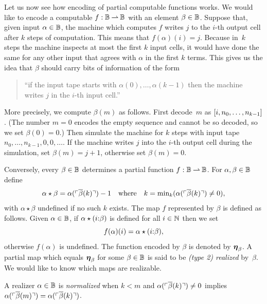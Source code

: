 Let us now see how encoding of partial computable functions works. We
would like to encode a computable $f : \mathbb{B} \mathbin{\rightharpoonup} \mathbb{B}$ with an
element $\beta \in \mathbb{B}$. Suppose that, given input $\alpha \in
\mathbb{B}$, the machine which computes $f$ writes $j$ to the $i$-th
output cell after $k$ steps of computation. This means that
$f(\alpha)(i) = j$. Because in~$k$ steps the machine inspects at most
the first $k$ input cells, it would have done the same for any other
input that agrees with $\alpha$ in the first $k$ terms. This gives us
the idea that $\beta$ should carry bits of information of the form
%
\begin{quote}
  ``if the input tape starts with $\alpha(0), \ldots,
  \alpha(k-1)$ then the machine writes $j$ in the $i$-th input
  cell.''
\end{quote}
%
More precisely, we compute $\beta(m)$ as follows. First decode~$m$ as
$[i, n_0, \ldots, n_{k-1}]$. (The number $m = 0$ encodes the empty
sequence and cannot be so decoded, so we set $\beta(0) = 0$.) Then
simulate the machine for $k$ steps with input tape $n_0, \ldots,
n_{k-1}, 0, 0, \ldots$. If the machine writes $j$ into the $i$-th
output cell during the simulation, set $\beta(m) = j + 1$, otherwise
set $\beta(m) = 0$.

Conversely, every $\beta \in \mathbb{B}$ determines a partial function $f :
\mathbb{B} \mathbin{\rightharpoonup} \mathbb{B}$. For $\alpha, \beta \in \mathbb{B}$ define
%
\begin{equation*}
  \alpha \star \beta = \alpha(\ulcorner \overline{\beta}(k) \urcorner) - 1
  \quad\text{where}\quad
  k = \min\nolimits_k (\alpha(\ulcorner \overline{\beta}(k) \urcorner) \neq 0),
\end{equation*}
%
with $\alpha \star \beta$ undefined if no such $k$ exists. The map $f$
represented by $\beta$ is defined as follows. Given $\alpha \in
\mathbb{B}$, if $\alpha \star
(i {:} \beta)$ is defined for all $i \in \mathbb{N}$ then we set
%
\begin{equation}
  \label{eq:type2-encoding}
  f(\alpha)(i) = \alpha \star (i {:} \beta),
\end{equation}
%
otherwise $f(\alpha)$ is undefined. The function encoded by $\beta$ is
denoted by $\text{\boldmath{$\eta$}}_\beta$. A partial map which equals $\text{\boldmath{$\eta$}}_\beta$ for
some $\beta \in \mathbb{B}$ is said to be \emph{(type 2) realized}
by~$\beta$. We would like to know which maps are realizable.

\begin{definition}
  \label{def:normalized-BB}%
  A realizer $\alpha \in \mathbb{B}$ is \emph{normalized} when $k < m$ and
  $\alpha(\ulcorner \overline{\beta}(k) \urcorner) \neq 0$ implies
  $\alpha(\ulcorner \overline{\beta}(m) \urcorner) = \alpha(\ulcorner \overline{\beta}(k) \urcorner)$.
\end{definition}

